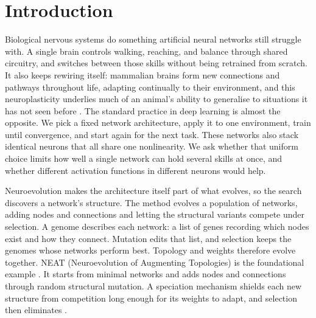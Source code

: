 
\graphicspath{{../Figures/}{Figures/}}

\chapter{Introduction}
\label{sec:introduction}

Biological nervous systems do something artificial neural networks still struggle with.
A single brain controls walking, reaching, and balance through shared circuitry, and switches between those skills without being retrained from scratch.
It also keeps rewiring itself: mammalian brains form new connections and pathways throughout life, adapting continually to their environment, and this neuroplasticity underlies much of an animal's ability to generalise to situations it has not seen before \parencite{pascual-leone_plastic_2005}.
The standard practice in deep learning is almost the opposite.
We pick a fixed network architecture, apply it to one environment, train until convergence, and start again for the next task.
These networks also stack identical neurons that all share one nonlinearity.
We ask whether that uniform choice limits how well a single network can hold several skills at once, and whether different activation functions in different neurons would help.

Neuroevolution makes the architecture itself part of what evolves, so the search discovers a network's structure.
The method evolves a population of networks, adding nodes and connections and letting the structural variants compete under selection.
A genome describes each network: a list of genes recording which nodes exist and how they connect.
Mutation edits that list, and selection keeps the genomes whose networks perform best.
Topology and weights therefore evolve together.
NEAT (Neuroevolution of Augmenting Topologies) is the foundational example \parencite{stanley_evolving_2002}.
It starts from minimal networks and adds nodes and connections through random structural mutation. A speciation mechanism shields each new structure from competition long enough for its weights to adapt, and selection then eliminates .


